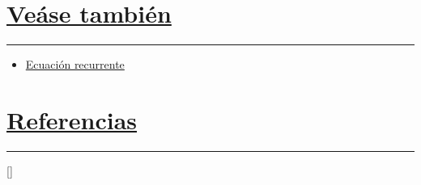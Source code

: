 \documentclass[a4paper,11pt]{article}
\begin{document}
\section[Veáse también]{\hyperlink{toc}{Veáse también}}
{\color {Gray} \rule {\linewidth}{0.1mm}}
\begin{itemize}[label={$\bullet$}]
    \item \href{https://es.wikipedia.org/wiki/Ecuación_recurrente}{Ecuación recurrente}
\end{itemize}
	
\section[Referencias]{\hyperlink{toc}{Referencias}}
{\color {Gray} \rule {\linewidth}{0.1mm}}
[\refname]{} 
\printbibliography
\end{document}
